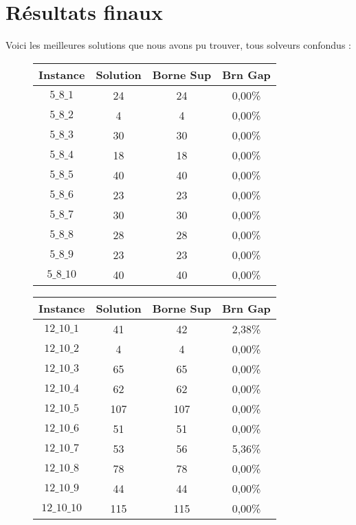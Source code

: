 \documentclass[a4paper, 11pt]{article} %
\begin{document}
\section{Résultats finaux}
Voici les meilleures solutions que nous avons pu trouver, tous solveurs confondus :

\begin{center}
\begin{figure}[H]
   \begin{minipage}[c]{.46\linewidth}
      \begin{tabular}{|c|c|c|c|}
      \hline 
        Instance & Solution & Borne Sup & Brn Gap  \\ \hline
$5\_8\_1$ & 24 &  24 &  0,00\% \\ \hline
$5\_8\_2$ & 4 & 4 & 0,00\% \\ \hline
$5\_8\_3$ & 30 &  30 &  0,00\% \\ \hline
$5\_8\_4$ & 18 &  18 &  0,00\% \\ \hline
$5\_8\_5$ & 40 &  40 &  0,00\% \\ \hline
$5\_8\_6$ & 23 &  23 &  0,00\% \\ \hline
$5\_8\_7$ & 30 &  30 &  0,00\% \\ \hline
$5\_8\_8$ & 28 &  28 &  0,00\% \\ \hline
$5\_8\_9$ & 23 &  23 &  0,00\% \\ \hline
$5\_8\_10$ & 40 &  40 &  0,00\% \\ \hline
      \end{tabular}
   \end{minipage} \hfill
   \begin{minipage}[c]{.46\linewidth}
      \begin{tabular}{|c|c|c|c|}
      \hline 
        Instance & Solution & Borne Sup & Brn Gap  \\ \hline
$12\_10\_1$ & 41 &  42 &  2,38\% \\ \hline
$12\_10\_2$ & 4 & 4 & 0,00\% \\ \hline
$12\_10\_3$ & 65 &  65 &  0,00\% \\ \hline
$12\_10\_4$ & 62 &  62 &  0,00\% \\ \hline
$12\_10\_5$ & 107 & 107 & 0,00\% \\ \hline
$12\_10\_6$ & 51 &  51 &  0,00\% \\ \hline
$12\_10\_7$ & 53 &  56 &  5,36\% \\ \hline
$12\_10\_8$ & 78 &  78 &  0,00\% \\ \hline
$12\_10\_9$ & 44 &  44 &  0,00\% \\ \hline
$12\_10\_10$ & 115 & 115 & 0,00\% \\ \hline
      \end{tabular}
   \end{minipage}
\end{figure}


\end{center}
\end{document}
